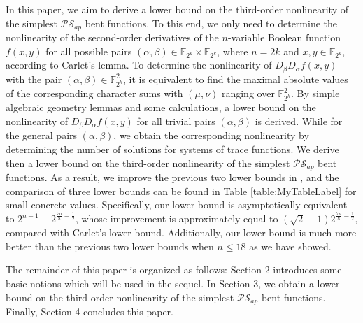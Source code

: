 \documentclass{article}
\newcommand{\F}{\mathbb{F}}
\newcommand{\0}{\textbf{0}}
\newcommand{\1}{\textbf{1}}
\theoremstyle{plain}
\begin{document}
    In this paper, we aim to derive a lower bound on the third-order nonlinearity of the simplest $\mathcal{PS}_{ap}$ bent functions.
    To this end, we only need to determine the nonlinearity of the second-order derivatives of the $n$-variable Boolean function $f(x,y)$ for all possible pairs $(\alpha,\beta)\in\F_{2^k}\times\F_{2^k}$, where $n=2k$ and $x,y\in\F_{2^k}$, according to Carlet's lemma.
    To determine the nonlinearity of $D_{\beta}D_{\alpha}f(x,y)$ with the pair $(\alpha,\beta)\in\F_{2^k}^2$, it is equivalent to find the maximal absolute values of the corresponding character sums with $(\mu,\nu)$ ranging over $\F_{2^k}^2$.
    By simple algebraic geometry lemmas and some calculations, a lower bound on the nonlinearity of $D_{\beta}D_{\alpha}f(x,y)$ for all trivial pairs $(\alpha,\beta)$ is derived.
    While for the general pairs $(\alpha,\beta)$, we obtain the corresponding nonlinearity by determining the number of solutions for systems of trace functions.
    We derive then a lower bound on the third-order nonlinearity of the simplest $\mathcal{PS}_{ap}$ bent functions.
    As a result,
    we improve the previous two lower bounds in \cite{TangCT2013NL_2bent,Carlet2011NL_Profile_Dillon}, and the comparison of three lower bounds can be found in Table \ref{table:MyTableLabel} for small concrete values.
    Specifically, our lower bound is asymptotically equivalent to $2^{n-1}-2^{\frac{7n}{8}-\frac{1}{2}}$, whose
    improvement is approximately equal to $(\sqrt{2}-1)2^{\frac{7n}{8}-\frac{1}{2}}$, compared with Carlet's lower bound.
    Additionally, our lower bound is much more better than the previous two lower bounds when $n\le 18$ as we have showed.

    The remainder of this paper is organized as follows:
    Section 2 introduces some basic notions which will be used in the sequel.
    In Section 3, we  obtain a lower bound on the third-order nonlinearity of the simplest $\mathcal{PS}_{ap}$ bent functions.
    Finally, Section 4 concludes this paper.
\end{document}
